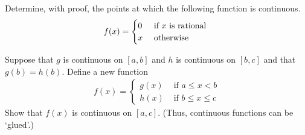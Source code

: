 \documentclass[9pt, a4paper, oneside]{amsart}
\begin{document}
\begin{questions}[resume]
\begin{enumerate}
	\end{enumerate}


	\item Determine, with proof, the points at which the following function is continuous.
	$$ f(x) = \begin{cases} 0 & \mbox{ if $ x$ is rational } \\ x & \mbox{ otherwise }\end{cases}$$


	\item Suppose that $ g$ is continuous on $[a,b]$ and $ h$ is continuous on $[b,c]$ and that $ g(b) = h(b)$. Define a new function
	\begin{align*}
		f(x) = \begin{cases} g(x) & \mbox{ if }a \le x < b \\ h(x) & \mbox{ if }b \le x \le c  \end{cases}
	\end{align*}
	Show that $ f(x)$ is continuous on $ [a,c]$. (Thus, continuous functions can be `glued'.)

\end{questions}










\newpage
\end{document}

